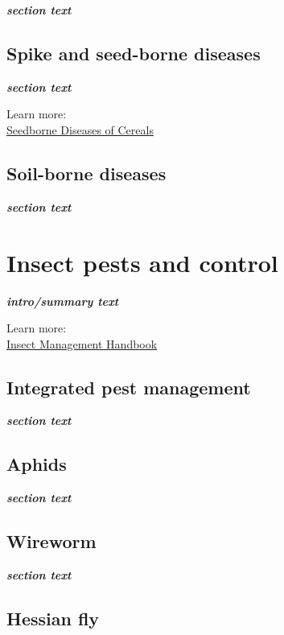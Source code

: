 \documentclass[
  letterpaper,
  DIV=11,
  numbers=noendperiod]{scrreprt}
\begin{document}
\textbf{\emph{section text}}

\section{Spike and seed-borne
diseases}\label{spike-and-seed-borne-diseases}

\textbf{\emph{section text}}

Learn more:\\
\href{https://objects.lib.uidaho.edu/uiext/uiext30078.pdf}{Seedborne
Diseases of Cereals}

\section{Soil-borne diseases}\label{soil-borne-diseases}

\textbf{\emph{section text}}


\chapter{Insect pests and control}\label{insect-pests-and-control}

\textbf{\emph{intro/summary text}}

Learn more:\\
\href{https://pnwhandbooks.org/insect}{Insect Management Handbook}

\section{Integrated pest management}\label{integrated-pest-management}

\textbf{\emph{section text}}

\section{Aphids}\label{aphids}

\textbf{\emph{section text}}

\section{Wireworm}\label{wireworm}

\textbf{\emph{section text}}

\section{Hessian fly}\label{hessian-fly}
\end{document}
